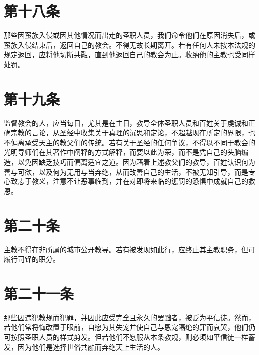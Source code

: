 \section{第十八条}

那些因蛮族入侵或因其他情况而出走的圣职人员，我们命令他们在原因消失后，或蛮族入侵结束后，返回自己的教会。不得无故长期离开。若有任何人未按本法规的规定返回，应将他切断共融，直到他返回自己的教会为止。收纳他的主教也受同样处罚。\par


\section{第十九条}

监督教会的人，应当每日，尤其是在主日，教导全体圣职人员和百姓关于虔诚和正确宗教的言论，从圣经中收集关于真理的沉思和定论，不超越现在所定的界限，也不偏离承受天主的教父们的传统。若有关于圣经的任何争议，不得以不同于教会的光明导师们在其著作中阐释的方式解释，而要以此为荣，而不是凭自己的头脑编造，以免因缺乏技巧而偏离适宜之道。因为藉着上述教父们的教导，百姓认识何为善与可欲，以及何为无用与当弃绝，从而改善自己的生活，不被无知引导，而是专心致志于教义，注意不让恶事临到，并在对即将来临的惩罚的恐惧中成就自己的救恩。\par


\section{第二十条}

主教不得在非所属的城市公开教导。若有被发现如此行，应终止其主教职务，但可履行司铎的职分。\par


\section{第二十一条}

那些因违犯教规而犯罪，并因此应受完全且永久的罢黜者，被贬为平信徒。然而，若他们常将悔改置于眼前，自愿为其失宠并使自己与恩宠隔绝的罪而哀哭，他们仍可按照圣职人员的样式剪发。但若他们不愿服从本条教规，则必须如平信徒一样蓄发，因为他们是选择世俗共融而弃绝天上生活的人。\par

